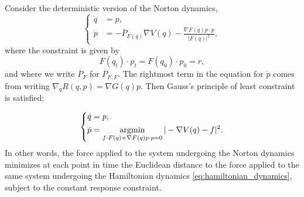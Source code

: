 \begin{prop}\label{prop:constrained_dynamics}
    Consider the deterministic version of the Norton dynamics,
    \begin{equation}
        \label{eq:norton_dynamics}
        \left\{\begin{aligned}
        \dot{q} &= p,\\
        \dot{p}&= -\overline{P}_{F(q)}\nabla V(q) - \frac{\nabla F(q)p\cdot p}{|F(q)|^2},
        \end{aligned}\right.
    \end{equation}
    where the constraint is given by 
    \[F(q_t)\cdot p_t = F(q_0)\cdot p_0=r,\]
    and where we write $\overline{P}_F$ for $\overline{P}_{F,F}$.
    The rightmost term in the equation for $\dot p$ comes from writing $\nabla_q R(q,p)=\nabla G(q)p$.
    Then Gauss's principle of least constraint is satisfied:

    \begin{equation}
        \label{eq:GPOLC_norton}
        \left\{\begin{aligned}
            \dot{q} &= p,\\
            \dot{p}&= \underset{f\cdot F(q)+\nabla F(q)p\cdot p =0}{\operatorname*{argmin}}\,|-\nabla V(q)-f|^2.
            \end{aligned}\right.
    \end{equation}
    In other words, the force applied to the system undergoing the Norton dynamics minimizes at each point in time the Euclidean distance to the force applied to the same system undergoing the Hamiltonian dynamics \eqref{eq:hamiltonian_dynamics}, subject to the constant response constraint.
\end{prop}
